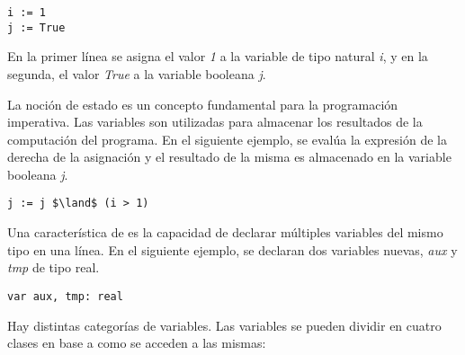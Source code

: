 \documentclass{article}
\begin{document}
\begin{lstlisting}
i := 1
j := True
\end{lstlisting}

En la primer línea se asigna el valor \textit{1} a la variable de tipo natural \textit{i}, y en la segunda, el valor \textit{True} a la variable booleana \textit{j}.

La noción de estado es un concepto fundamental para la programación imperativa.
Las variables son utilizadas para almacenar los resultados de la computación del programa.
En el siguiente ejemplo, se evalúa la expresión de la derecha de la asignación y el resultado de la misma es almacenado en la variable booleana \textit{j}.

\begin{lstlisting}
j := j $\land$ (i > 1)
\end{lstlisting}

Una característica de \Lang\space es la capacidad de declarar múltiples variables del mismo tipo en una línea.
En el siguiente ejemplo, se declaran dos variables nuevas, \textit{aux} y \textit{tmp} de tipo real.

\begin{lstlisting}
var aux, tmp: real
\end{lstlisting}

Hay distintas categorías de variables.
Las variables se pueden dividir en cuatro clases en base a como se acceden a las mismas:
\end{document}

